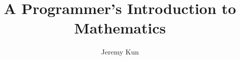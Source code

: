 \documentclass[11pt]{memoir}
\title{A Programmer's Introduction to Mathematics}
\author{Jeremy Kun}
\begin{document}

\newpage

\newpage

\newpage

\newpage

\begin{KeepFromToc}
\tableofcontents
\end{KeepFromToc}
\clearpage
{}
\setcounter{page}{0}




\newpage

\newpage

\printindex
\end{document}
